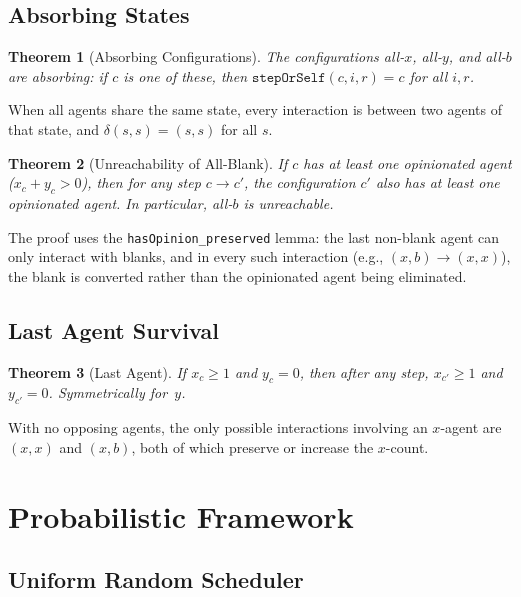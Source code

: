 \documentclass[11pt,a4paper]{article}
\newtheorem{theorem}{Theorem}[section]
\begin{document}
\subsection{Absorbing States}

\begin{theorem}[Absorbing Configurations]
The configurations all-$x$, all-$y$, and all-$b$ are absorbing:
if $c$ is one of these, then $\texttt{stepOrSelf}(c, i, r) = c$ for all
$i, r$.
\end{theorem}

When all agents share the same state, every interaction is between two
agents of that state, and $\delta(s,s) = (s,s)$ for all $s$.

\begin{theorem}[Unreachability of All-Blank]
\label{thm:allb}
If $c$ has at least one opinionated agent ($x_c + y_c > 0$), then for any
step $c \to c'$, the configuration $c'$ also has at least one opinionated
agent.  In particular, all-$b$ is unreachable.
\end{theorem}

The proof uses the \texttt{hasOpinion\_preserved} lemma: the last non-blank
agent can only interact with blanks, and in every such interaction (e.g.,
$(x, b) \to (x, x)$), the blank is converted rather than the opinionated
agent being eliminated.

\subsection{Last Agent Survival}

\begin{theorem}[Last Agent]
If $x_c \geq 1$ and $y_c = 0$, then after any step, $x_{c'} \geq 1$ and
$y_{c'} = 0$.  Symmetrically for~$y$.
\end{theorem}

With no opposing agents, the only possible interactions involving an $x$-agent
are $(x,x)$ and $(x,b)$, both of which preserve or increase the $x$-count.

\section{Probabilistic Framework}
\label{sec:probability}

\subsection{Uniform Random Scheduler}
\end{document}
